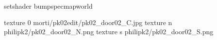setshader bumpspecmapworld

texture 0 morti/pk02edit/pk02_door02_C.jpg
texture n philipk2/pk02_door02_N.png
texture s philipk2/pk02_door02_S.png

